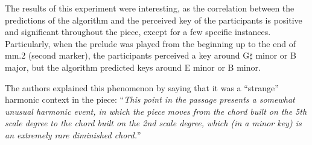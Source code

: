 The results of this experiment were interesting, as the
correlation between the predictions of the algorithm and the
perceived key of the participants is positive and
significant throughout the piece, except for a few specific
instances. Particularly, when the prelude was played from
the beginning up to the end of mm.2 (second marker), the
participants perceived a key around G$\sharp$ minor or B
major, but the algorithm predicted keys around E minor or B
minor.

The authors explained this phenomenon by saying that it was
a ``strange'' harmonic context in the piece: ``\emph{This
point in the passage presents a somewhat unusual harmonic
event, in which the piece moves from the chord built on the
5th scale degree to the chord built on the 2nd scale degree,
which (in a minor key) is an extremely rare diminished
chord.}''












